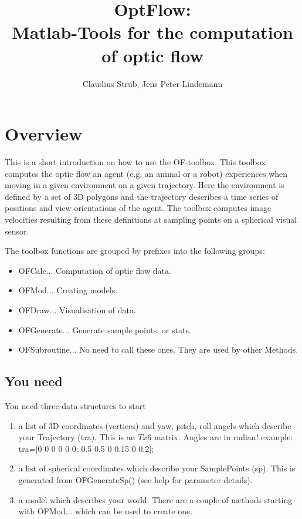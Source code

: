 \documentclass[a4paper]{article}
\begin{document}
\title{OptFlow:\\Matlab-Tools for the computation of optic flow}
\author{Claudius Strub, Jens Peter Lindemann}
\maketitle

\section{Overview}

This is a short introduction on how to use the OF-toolbox. This toolbox computes the optic flow an agent (e.g. an animal or a robot) experiences when moving in a given environment on a given trajectory. Here the environment is defined by a set of 3D polygons and the trajectory describes a time series of positions and view orientations of the agent. The toolbox computes image velocities resulting from these definitions at sampling points on a spherical visual sensor.

The toolbox functions are grouped by prefixes into the following groups:

\begin{itemize}
\item OFCalc... Computation of optic flow data.
\item OFMod... Creating models.
\item OFDraw... Visualisation of data.
\item OFGenerate... Generate sample points, or stats.
\item OFSubroutine... No need to call these ones. They are used by other Methods.

\end{itemize}

\subsection{You need}

You need three data structures to start
  \begin{enumerate}
  \item a list of 3D-coordinates (vertices) and yaw, pitch, roll angels which describe your Trajectory (tra). This is an $Tx6$ matrix. Angles are in radian!\newline
example: tra=[0 0 0 0 0 0; 0.5 0.5 0 0.15 0 0.2];
  \item a list of spherical coordinates which describe your SamplePoints (sp). This is generated from OFGenerateSp() (see help for parameter details).
  \item a model which describes your world. There are a couple of methods starting with OFMod... which can be used to create one.
  \end{enumerate}
\end{document}
